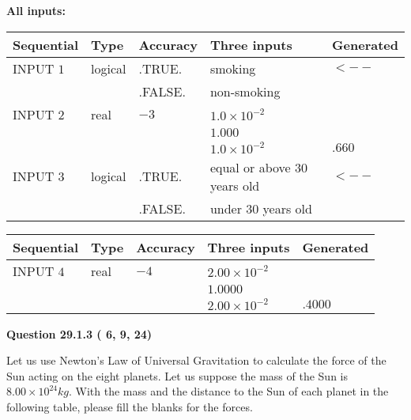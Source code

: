 \documentclass[12pt]{article}
\begin{document}
   
   
   
\noindent\vspace{0.1in}\hspace{-0.08in} {\textbf{\Large{All inputs: }}}
   
   
  
  
\noindent\begin{tabular}{|l|l|l|l|l|}
\hline
 Sequential & Type & Accuracy & Three inputs & Generated \\ 
\hline
 
 
  INPUT $           1$ & logical & .TRUE. & 
 smoking & 
  $ <-- $ 
  \\
  & & .FALSE. & 
  non-smoking & 
 \\  \hline  
 
 
  INPUT $           2$ & real & $          -3 $ & $
 1.0 \times 10^{-2}
  $ & \\
  & & &  $
 1.000
  $ & \\
  & & &  $
 1.0 \times 10^{-2}
 $ & $ .660 $ 
 \\  \hline  
 
 
  INPUT $           3$ & logical & .TRUE. & 
 equal or above 30 years old & 
  $ <-- $ 
  \\
  & & .FALSE. & 
  under 30 years old & 
 \\  \hline  
 \end{tabular}
   
   
  
  
\noindent\begin{tabular}{|l|l|l|l|l|}
\hline
 Sequential & Type & Accuracy & Three inputs & Generated \\ 
\hline
 
 
  INPUT $           4$ & real & $          -4 $ & $
 2.00 \times 10^{-2}
  $ & \\
  & & &  $
 1.0000
  $ & \\
  & & &  $
 2.00 \times 10^{-2}
 $ & $ .4000 $ 
 \\  \hline  
 \end{tabular}
   
   
  
\vspace{0.2in}
  
{\textbf{\Large{Question
29.1.3 
 (          6,          9,         24)
}}}
  
  
Let us use Newton's Law of Universal Gravitation to calculate the force
of the Sun acting on the eight planets. Let us suppose the mass of the
Sun is $ %
8.00 \times 10^{24} kg$. With the mass and the
distance to the Sun of each planet in the following table, please fill
the blanks for the forces.
 
\end{document}
